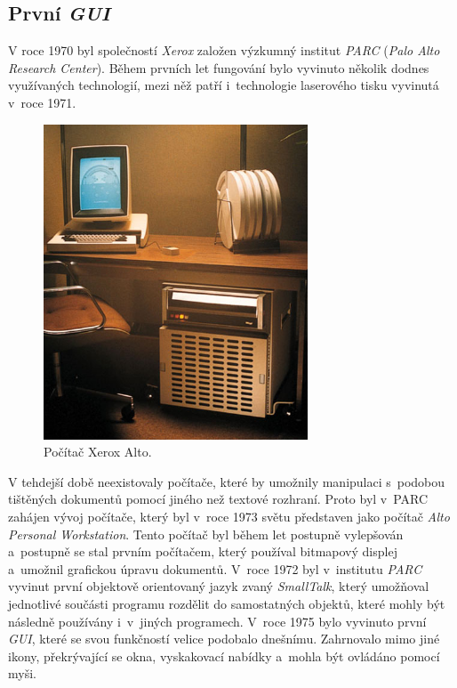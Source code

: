 \documentclass[11pt,twoside,a4paper]{book}
\begin{document}
\subsection{První \textit{GUI}}
V roce 1970 byl společností \textit{Xerox} založen výzkumný institut \textit{PARC} (\textit{Palo Alto Research Center}). Během prvních let fungování bylo vyvinuto několik dodnes využívaných technologií, mezi něž patří i~technologie laserového tisku vyvinutá v~roce 1971. 
\begin{figure}[!ht]
\begin{center}
  \includegraphics[width=0.7\textwidth]{XeroxAlto}
\caption{{\label{fig:alto}}Počítač Xerox Alto.\cite{bib:altoImage}}
\end{center}
\end{figure}
V tehdejší době neexistovaly počítače, které by umožnily manipulaci s~podobou tištěných dokumentů pomocí jiného než textové rozhraní. Proto byl v~PARC zahájen vývoj počítače, který byl v~roce 1973 světu představen jako počítač \textit{Alto Personal Workstation}. Tento počítač byl během let postupně vylepšován a~postupně se stal prvním počítačem, který používal bitmapový displej a~umožnil grafickou úpravu dokumentů. V~roce 1972 byl v~institutu \textit{PARC} vyvinut první objektově orientovaný jazyk zvaný \textit{SmallTalk}, který umožňoval jednotlivé součásti programu rozdělit do samostatných objektů, které mohly být následně používány i~v~jiných programech. V~roce 1975 bylo vyvinuto první \textit{GUI}, které se svou funkčností velice podobalo dnešnímu. Zahrnovalo mimo jiné ikony, překrývající se okna, vyskakovací nabídky a~mohla být ovládáno pomocí myši. \cite{bib:PARC}
\end{document}
